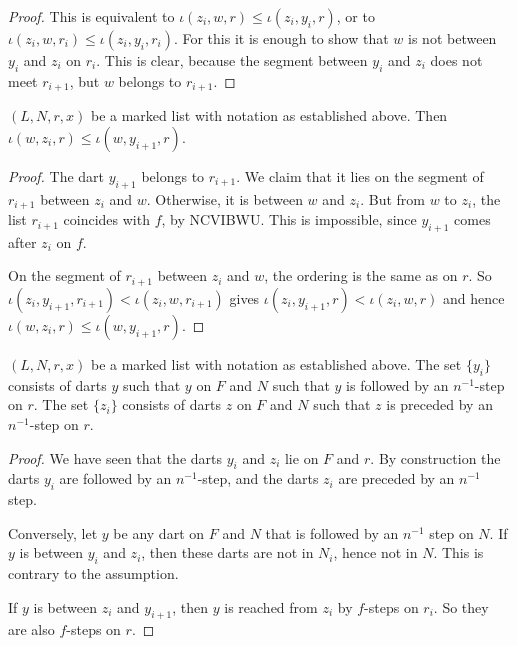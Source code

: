 \begin{proof}
This is equivalent to $\iota(z_i,w,r) \le \iota(z_i,y_i,r)$,  or to $\iota(z_i,w,r_i)\le \iota(z_i,y_i,r_i)$. 
For this it is enough to show that $w$ is not between $y_i$ and $z_i$ on $r_i$.  This is clear,
because the segment between $y_i$ and $z_i$ does not meet $r_{i+1}$, but $w$ belongs to $r_{i+1}$.
\end{proof}

\begin{lemma}
$(L,N,r,x)$ be a marked list with notation as established above.
Then $\iota(w,z_i,r) \le \iota(w,y_{i+1},r)$.
\end{lemma}

\begin{proof}  
The dart $y_{i+1}$ belongs to $r_{i+1}$.  We claim that it lies on the segment of $r_{i+1}$ between $z_i$ and $w$.
Otherwise, it is between $w$ and $z_i$.  But from $w$ to $z_i$, the list $r_{i+1}$ coincides with $f$, by NCVIBWU.  This is impossible,
since $y_{i+1}$ comes after $z_i$ on $f$.

On the segment of $r_{i+1}$ between $z_i$ and $w$, the ordering is the same as on $r$.
So $\iota(z_i,y_{i+1},r_{i+1}) < \iota(z_i,w,r_{i+1})$ gives $\iota(z_i,y_{i+1},r) < \iota(z_i,w,r)$ and hence
$\iota(w,z_i,r) \le \iota(w,y_{i+1},r)$.
\end{proof}

\begin{lemma} 
$(L,N,r,x)$ be a marked list with notation as established above.
The set $\{y_i\}$ consists of darts $y$ such that
$y$ on $F$ and $N$ such that $y$ is followed by an 
$n^{-1}$-step on $r$.
The set $\{z_i\}$ consists of darts $z$ on $F$ and $N$ such that
$z$ is preceded by an $n^{-1}$-step on $r$.
\end{lemma} 

\begin{proof}  We have seen that the darts $y_i$ and $z_i$ lie on $F$ and $r$.
By construction the darts $y_i$ are followed by an $n^{-1}$-step, and the darts
$z_i$ are preceded by an $n^{-1}$ step.

Conversely, let $y$ be any dart on $F$ and $N$ that is followed by an $n^{-1}$ step on $N$.
If $y$ is between $y_i$ and $z_i$, then these darts are not in $N_i$, hence not in $N$.  
This is contrary
to the assumption.

If $y$ is between $z_i$ and $y_{i+1}$, then $y$ is reached from $z_i$ by $f$-steps on $r_i$.
So they are also $f$-steps on $r$.
\end{proof}

